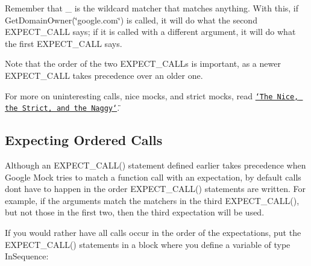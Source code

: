 \begin{DoxyCode}{0}
\end{DoxyCode}


Remember that {\ttfamily \+\_\+} is the wildcard matcher that matches anything. With this, if {\ttfamily Get\+Domain\+Owner(\char`\"{}google.\+com\char`\"{})} is called, it will do what the second {\ttfamily E\+X\+P\+E\+C\+T\+\_\+\+C\+A\+LL} says; if it is called with a different argument, it will do what the first {\ttfamily E\+X\+P\+E\+C\+T\+\_\+\+C\+A\+LL} says.

Note that the order of the two {\ttfamily E\+X\+P\+E\+C\+T\+\_\+\+C\+A\+L\+Ls} is important, as a newer {\ttfamily E\+X\+P\+E\+C\+T\+\_\+\+C\+A\+LL} takes precedence over an older one.

For more on uninteresting calls, nice mocks, and strict mocks, read \href{#the-nice-the-strict-and-the-naggy}{\tt \char`\"{}\+The Nice, the Strict, and the Naggy\char`\"{}}.

\subsection*{Expecting Ordered Calls}

Although an {\ttfamily E\+X\+P\+E\+C\+T\+\_\+\+C\+A\+L\+L()} statement defined earlier takes precedence when Google Mock tries to match a function call with an expectation, by default calls don\textquotesingle{}t have to happen in the order {\ttfamily E\+X\+P\+E\+C\+T\+\_\+\+C\+A\+L\+L()} statements are written. For example, if the arguments match the matchers in the third {\ttfamily E\+X\+P\+E\+C\+T\+\_\+\+C\+A\+L\+L()}, but not those in the first two, then the third expectation will be used.

If you would rather have all calls occur in the order of the expectations, put the {\ttfamily E\+X\+P\+E\+C\+T\+\_\+\+C\+A\+L\+L()} statements in a block where you define a variable of type {\ttfamily In\+Sequence}\+:


\begin{DoxyCode}{0}
\DoxyCodeLine{}
\DoxyCodeLine{\{}
\DoxyCodeLine{}
\DoxyCodeLine{\}}
\end{DoxyCode}


